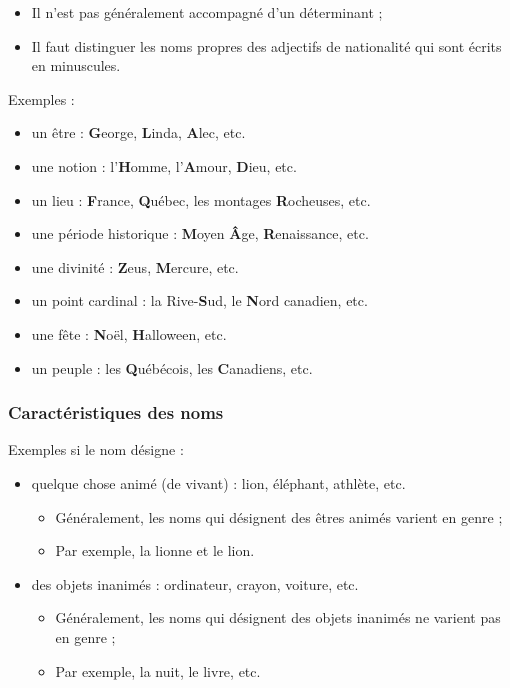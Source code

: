 \documentclass[10pt, french]{article}
\begin{document}
\begin{multicols*}{2}
\begin{definitionNOHFILLsub}
\begin{itemize}
	\item	Il n'est pas généralement accompagné d'un déterminant ;
	\item	Il faut distinguer les noms propres des adjectifs de nationalité qui sont écrits en minuscules.
\end{itemize}

\tcbline

Exemples :
\begin{itemize}
	\item	un être : \textbf{G}eorge, \textbf{L}inda, \textbf{A}lec, etc.
	\item	une notion : l'\textbf{H}omme, l'\textbf{A}mour, \textbf{D}ieu, etc.
	\item	un lieu : \textbf{F}rance, \textbf{Q}uébec, les montages \textbf{R}ocheuses, etc.
	\item	une période historique : \textbf{M}oyen \textbf{Â}ge, \textbf{R}enaissance, etc.
	\item	une divinité : \textbf{Z}eus, \textbf{M}ercure, etc.
	\item	un point cardinal : la Rive-\textbf{S}ud, le \textbf{N}ord canadien, etc.
	\item	une fête : \textbf{N}oël, \textbf{H}alloween, etc.
	\item	un peuple : les \textbf{Q}uébécois, les \textbf{C}anadiens, etc.
\end{itemize}
\end{definitionNOHFILLsub}


\subsubsection*{Caractéristiques des noms}
\begin{definitionNOHFILLpropos}
Exemples si le nom désigne :
\begin{itemize}
	\item	quelque chose animé (de vivant) : lion, éléphant, athlète, etc.
		\begin{itemize}
		\item	Généralement, les noms qui désignent des êtres animés varient en genre ;
		\item	Par exemple, la lionne et le lion.
		\end{itemize}
	\item	des objets inanimés : ordinateur, crayon, voiture, etc.
		\begin{itemize}
		\item	Généralement, les noms qui désignent des objets inanimés ne varient pas en genre ;
		\item	Par exemple, la nuit, le livre, etc.
		\end{itemize}
\end{itemize}
\end{definitionNOHFILLpropos}



\end{multicols*}
\end{document}
